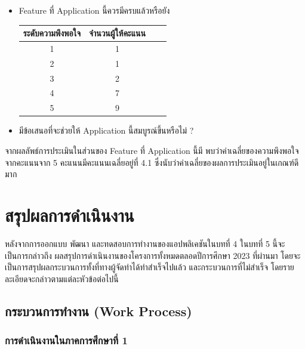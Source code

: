 \documentclass[14pt,oneside,openright,a4paper]{cpe-thai-project}
\begin{document}
\begin{itemize}
  \item Feature ที่ Application นี้ควรมีครบแล้วหรือยัง
  \begin{table}[!h]
    \centering
    \captionsetup{justification=centering} %
    \begin{tabular}{|c|c|c|c|}
      \hline
      \multicolumn{1}{|c|}{\cellcolor[HTML]{9FC5E8}ระดับความพึงพอใจ} &
        \multicolumn{1}{c|}{\cellcolor[HTML]{9FC5E8}จำนวนผู้ให้คะแนน} \\ \hline
       1 & 1
         \\ \hline 
       2 & 1
         \\ \hline 
       3 & 2
         \\ \hline 
       4 & 7
         \\ \hline 
       5 & 9
         \\ \hline
    \end{tabular}
    \label{tab:Featuresatisfaction}
  \end{table}
  \item มีข้อเสนอที่จะช่วยให้ Application นี้สมบูรณ์ขึ้นหรือไม่ ?
\end{itemize}
จากผลลัพธ์การประเมินในส่วนของ Feature ที่ Application นี้มี พบว่าค่าเฉลี่ยของความพึงพอใจจากคะแนนจาก 5 คะแนนมีคะแนนเฉลี่ยอยู่ที่ 4.1 ซึ่งนับว่าค่าเฉลี่ยของผลการประเมินอยู่ในเกณฑ์ดีมาก

\newpage
\chapter{สรุปผลการดำเนินงาน}
หลังจากการออกแบบ พัฒนา และทดสอบการทํางานของแอปพลิเคชันในบทที่ 4 ในบทที่ 5 นี้จะเป็นการกล่าวถึง
ผลสรุปการดำเนินงานของโครงการทั้งหมดตลอดปีการศึกษา 2023 ที่ผ่านมา โดยจะเป็นการสรุปผลกระบวนการทั้งที่ทางผู้จัดทำได้ทำสำเร็จไปแล้ว 
และกระบวนการที่ไม่สำเร็จ โดยรายละเอียดจะกล่าวตามแต่ละหัวข้อต่อไปนี้
\section{กระบวนการทำงาน (Work Process)}
\subsection{การดำเนินงานในภาคการศึกษาที่ 1}
\end{document}
